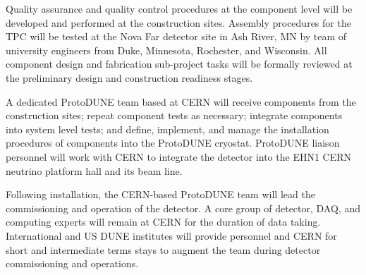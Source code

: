 Quality assurance and quality control procedures at the component level will
be developed and performed at the construction sites.  Assembly procedures
for the TPC will be tested at the Nova Far detector site in Ash River, MN by
team of university engineers from Duke, Minnesota, Rochester, and Wisconsin.
 All component design and fabrication sub-project tasks will be formally
reviewed at the preliminary design and construction readiness stages.

A dedicated ProtoDUNE team based at CERN will receive components from the
construction sites; repeat component tests as necessary; integrate components
into system level tests; and define, implement, and manage the installation
procedures of components into the ProtoDUNE cryostat.  ProtoDUNE liaison
personnel will work with CERN to integrate the detector into the EHN1 CERN
neutrino platform hall and its beam line.

Following installation, the CERN-based ProtoDUNE team will lead the
commissioning and operation of the detector.  A core group of detector, DAQ,
and computing experts will remain at CERN for the duration of data taking.
 International and US DUNE institutes will provide personnel and CERN for
short and intermediate terms stays to augment the team during detector
commissioning and operations.

